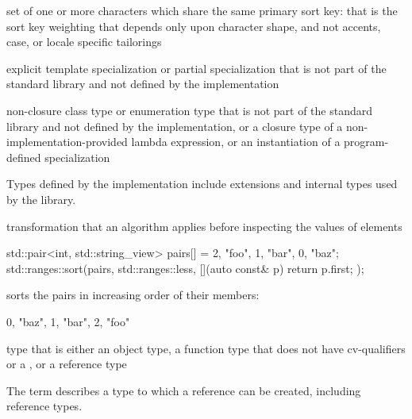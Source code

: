 %
set of one or more characters which
share the same primary sort key: that is the sort key weighting that
depends only upon character shape, and not accents, case, or
locale specific tailorings

%
explicit template specialization or partial specialization
that is not part of the \Cpp{} standard library and
not defined by the implementation

%
non-closure class type or enumeration type
that is not part of the \Cpp{} standard library and
not defined by the implementation,
or a closure type of a non-implementation-provided lambda expression,
or an instantiation of a program-defined specialization

\begin{defnote}
Types defined by the implementation include
extensions and internal types used by the library.
\end{defnote}

%
transformation that an algorithm applies
before inspecting the values of elements

\begin{example}
\begin{codeblock}
std::pair<int, std::string_view> pairs[] = {{2, "foo"}, {1, "bar"}, {0, "baz"}};
std::ranges::sort(pairs, std::ranges::less{}, [](auto const& p) { return p.first; });
\end{codeblock}
sorts the pairs in increasing order of their  members:
\begin{codeblock}
{{0, "baz"}, {1, "bar"}, {2, "foo"}}
\end{codeblock}
\end{example}

%
type that is either an
object type, a function type that does not have cv-qualifiers or a
, or a reference type

\begin{defnote}
The term describes a type to which a reference can be created,
including reference types.
\end{defnote}

